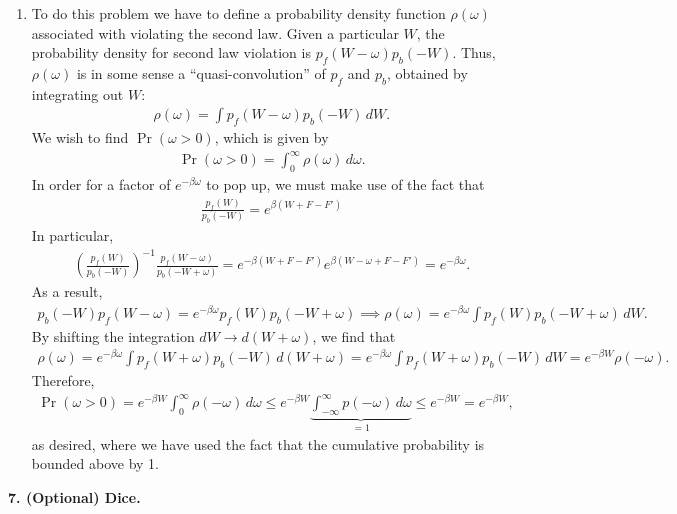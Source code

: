 \documentclass{article}
\theoremstyle{definition}
\newcommand{\be}{\beta}
\newcommand{\f}[2]{\frac{#1}{#2}}
\newcommand{\lp}{\left(}
\newcommand{\rp}{\right)}
\begin{document}
\begin{enumerate}[label=(\alph*)]
	
	\item To do this problem we have to define a probability density function $\rho(\omega)$ associated with violating the second law. Given a particular $W$, the probability density for second law violation is $p_f(W-\omega)p_b(-W)$. Thus, $\rho(\omega)$ is in some sense a ``quasi-convolution'' of $p_f$ and $p_b$, obtained by integrating out $W$:
	\begin{align*}
	\rho(\omega) = \int p_f(W-\omega)p_b(-W)\,dW.
	\end{align*}  
	We wish to find $\Pr(\omega>0)$, which is given by 
	\begin{align*}
	\Pr(\omega>0) = \int_0^\infty \rho (\omega)\,d\omega.
	\end{align*}
	In order for a factor of $e^{-\be\omega}$ to pop up, we must make use of the fact that 
	\begin{align*}
	\f{p_f(W)}{p_b(-W)} = e^{\be(W+F-F')}
	\end{align*}
	In particular, 
	\begin{align*}
	\lp \f{p_f(W)}{p_b(-W)}\rp^{-1}  \f{p_f(W-\omega)}{p_b(-W+\omega)} = e^{-\be(W+F-F')} e^{\be(W-\omega+F-F')} = e^{-\be\omega}.
	\end{align*}
	As a result,
	\begin{align*}
	p_b(-W) p_f(W-\omega) = e^{-\be\omega} p_f(W) p_b(-W+\omega) \implies \rho(\omega) = e^{-\be\omega} \int p_f(W) p_b(-W+\omega)\,dW.
	\end{align*}
	By shifting the integration $dW \to d(W+\omega)$, we find that
	\begin{align*}
	\rho(\omega) = e^{-\be \omega} \int p_f(W+\omega) p_b(-W)\, d(W+\omega) =  e^{-\be \omega} \int p_f(W+\omega) p_b(-W)\, dW = e^{-\be W} \rho(-\omega).
	\end{align*}
	Therefore, 
	\begin{align*}
	\Pr(\omega>0) = e^{-\be W} \int_0^\infty \rho(-\omega)\,d\omega \leq e^{-\be W} \underbrace{\int_{-\infty}^\infty p(-\omega)\,d\omega}_{=1} \leq e^{-\be W} = e^{-\be W},
	\end{align*}
	as desired, where we have used the fact that the cumulative probability is bounded above by 1. 
	
\end{enumerate}


\noindent \textbf{7. (Optional) Dice. }
\end{document}
